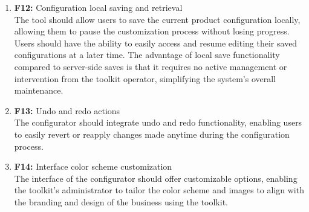 \begin{enumerate}
\item \textbf{F12:} Configuration local saving and retrieval
\vspace{2pt}
\\The tool should allow users to save the current product configuration locally, allowing them to pause the customization process without losing progress. Users should have the ability to easily access and resume editing their saved configurations at a later time. The advantage of local save functionality compared to server-side saves is that it requires no active management or intervention from the toolkit operator, simplifying the system's overall maintenance.
\vspace{4pt}

\item \textbf{F13:} \label{itm:F13} Undo and redo actions
\vspace{2pt}
\\The configurator should integrate undo and redo functionality, enabling users to easily revert or reapply changes made anytime during the configuration process.
\vspace{4pt}

\item \textbf{F14:} Interface color scheme customization \label{itm:F14}
\vspace{2pt}
\\The interface of the configurator should offer customizable options, enabling the toolkit's administrator to tailor the color scheme and images to align with the branding and design of the business using the toolkit.
\vspace{4pt}


\end{enumerate}
